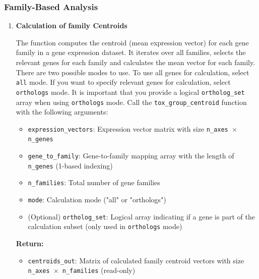 \subsubsection{Family-Based Analysis}
\begin{enumerate}
    \item \textbf{Calculation of family Centroids}
          
          The function computes the centroid (mean expression vector) for each gene family
          in a gene expression dataset. It iterates over all families, selects the relevant
          genes for each family and calculates the mean vector for each family.
          There are two possible modes to use. To use all genes for calculation,
          select \texttt{all} mode. If you want to specify relevant genes for
          calculation, select \texttt{orthologs} mode. It is important that you provide
          a logical \texttt{ortholog\_set} array when using \texttt{orthologs} mode.
          Call the \texttt{tox\_group\_centroid} function with the following arguments:
          
          \begin{itemize}
            \item \texttt{expression\_vectors}: Expression vector matrix with size \texttt{n\_axes
                  $\times$ n\_genes}
            
            \item \texttt{gene\_to\_family}: Gene-to-family mapping array with the length
                  of \texttt{n\_genes} (1-based indexing)
                  
            \item \texttt{n\_families}: Total number of gene families
                  
            \item \texttt{mode}: Calculation mode ("all" or "orthologs")
                  
            \item (Optional) \texttt{ortholog\_set}: Logical array indicating if a gene
                  is part of the calculation subset (only used in \texttt{orthologs} mode)
          \end{itemize}
          
          \textbf{Return:}
          \begin{itemize}
            \item \texttt{centroids\_out}: Matrix of calculated family centroid vectors
                  with size \texttt{n\_axes $\times$ n\_families} (read-only)
          \end{itemize}
          

\end{enumerate}

